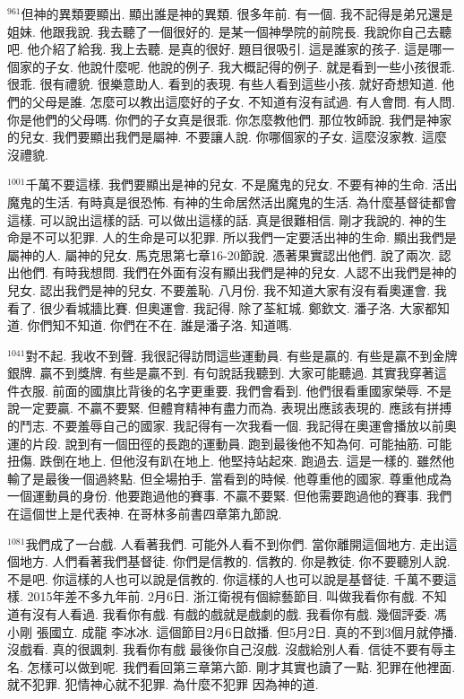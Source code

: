 \documentclass{book}
\begin{document}
$^{961}$但神的異類要顯出.
顯出誰是神的異類.
很多年前.
有一個.
我不記得是弟兄還是姐妹.
他跟我說.
我去聽了一個很好的.
是某一個神學院的前院長.
我說你自己去聽吧.
他介紹了給我.
我上去聽.
是真的很好.
題目很吸引.
這是誰家的孩子.
這是哪一個家的子女.
他說什麼呢.
他說的例子.
我大概記得的例子.
就是看到一些小孩很乖.
很乖.
很有禮貌.
很樂意助人.
看到的表現.
有些人看到這些小孩.
就好奇想知道.
他們的父母是誰.
怎麼可以教出這麼好的子女.
不知道有沒有試過.
有人會問.
有人問.
你是他們的父母嗎.
你們的子女真是很乖.
你怎麼教他們.
那位牧師說.
我們是神家的兒女.
我們要顯出我們是屬神.
不要讓人說.
你哪個家的子女.
這麼沒家教.
這麼沒禮貌.

$^{1001}$千萬不要這樣.
我們要顯出是神的兒女.
不是魔鬼的兒女.
不要有神的生命.
活出魔鬼的生活.
有時真是很恐怖.
有神的生命居然活出魔鬼的生活.
為什麼基督徒都會這樣.
可以說出這樣的話.
可以做出這樣的話.
真是很難相信.
剛才我說的.
神的生命是不可以犯罪.
人的生命是可以犯罪.
所以我們一定要活出神的生命.
顯出我們是屬神的人.
屬神的兒女.
馬克思第七章16-20節說.
憑著果實認出他們.
說了兩次.
認出他們.
有時我想問.
我們在外面有沒有顯出我們是神的兒女.
人認不出我們是神的兒女.
認出我們是神的兒女.
不要羞恥.
八月份.
我不知道大家有沒有看奧運會.
我看了.
很少看城牆比賽.
但奧運會.
我記得.
除了荃紅城.
鄭欽文.
潘子洛.
大家都知道.
你們知不知道.
你們在不在.
誰是潘子洛.
知道嗎.

$^{1041}$對不起.
我收不到聲.
我很記得訪問這些運動員.
有些是贏的.
有些是贏不到金牌銀牌.
贏不到獎牌.
有些是贏不到.
有句說話我聽到.
大家可能聽過.
其實我穿著這件衣服.
前面的國旗比背後的名字更重要.
我們會看到.
他們很看重國家榮辱.
不是說一定要贏.
不贏不要緊.
但體育精神有盡力而為.
表現出應該表現的.
應該有拼搏的鬥志.
不要羞辱自己的國家.
我記得有一次我看一個.
我記得在奧運會播放以前奧運的片段.
說到有一個田徑的長跑的運動員.
跑到最後他不知為何.
可能抽筋.
可能扭傷.
跌倒在地上.
但他沒有趴在地上.
他堅持站起來.
跑過去.
這是一樣的.
雖然他輸了是最後一個過終點.
但全場拍手.
當看到的時候.
他尊重他的國家.
尊重他成為一個運動員的身份.
他要跑過他的賽事.
不贏不要緊.
但他需要跑過他的賽事.
我們在這個世上是代表神.
在哥林多前書四章第九節說.

$^{1081}$我們成了一台戲.
人看著我們.
可能外人看不到你們.
當你離開這個地方.
走出這個地方.
人們看著我們基督徒.
你們是信教的.
信教的.
你是教徒.
你不要聽別人說.
不是吧.
你這樣的人也可以說是信教的.
你這樣的人也可以說是基督徒.
千萬不要這樣.
2015年差不多九年前.
2月6日.
浙江衛視有個綜藝節目.
叫做我看你有戲.
不知道有沒有人看過.
我看你有戲.
有戲的戲就是戲劇的戲.
我看你有戲.
幾個評委.
馮小剛 張國立.
成龍 李冰冰.
這個節目2月6日啟播.
但5月2日.
真的不到3個月就停播.
沒戲看.
真的很諷刺.
我看你有戲 最後你自己沒戲.
沒戲給別人看.
信徒不要有辱主名.
怎樣可以做到呢.
我們看回第三章第六節.
剛才其實也讀了一點.
犯罪在他裡面.
就不犯罪.
犯情神心就不犯罪.
為什麼不犯罪 因為神的道.
\end{document}

